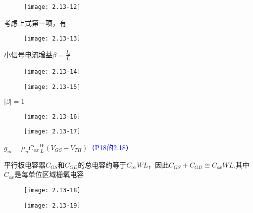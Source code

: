 \begin{figure}[H] %
	\begin{minipage}{\linewidth}
		\texttt{[image: 2.13-12]}
	\end{minipage}
\end{figure}

考虑上式第一项，有

\begin{figure}[H] %
	\begin{minipage}{\linewidth}
		\texttt{[image: 2.13-13]}
	\end{minipage}
\end{figure}

小信号电流增益$\beta =\frac{I_o}{I_i}$

\begin{figure}[H] %
	\begin{minipage}{\linewidth}
		\texttt{[image: 2.13-14]}
	\end{minipage}
\end{figure}

\begin{figure}[H] %
	\begin{minipage}{\linewidth}
		\texttt{[image: 2.13-15]}
	\end{minipage}
\end{figure}

$|\beta |=1$


\begin{figure}[H] %
	\begin{minipage}{\linewidth}
		\texttt{[image: 2.13-16]}
	\end{minipage}
\end{figure}

\begin{figure}[H] %
	\begin{minipage}{\linewidth}
		\texttt{[image: 2.13-17]}
	\end{minipage}
\end{figure}

\scalebox{3}{（c）}

$g_m=\mu_nC_{ox}\frac{W}{L}(V_{GS}-V_{TH})$\textcolor{blue}{（P18的2.18）}

平行板电容器$C_{GS}$和$C_{GD}$的总电容约等于$C_{ox}WL$，因此$C_{GS}+C_{GD}\cong C_{ox}WL$.其中$C_{ox}$是每单位区域栅氧电容


\begin{figure}[H] %
	\begin{minipage}{\linewidth}
		\texttt{[image: 2.13-18]}
	\end{minipage}
\end{figure}

\begin{figure}[H] %
	\begin{minipage}{\linewidth}
		\texttt{[image: 2.13-19]}
	\end{minipage}
\end{figure}



